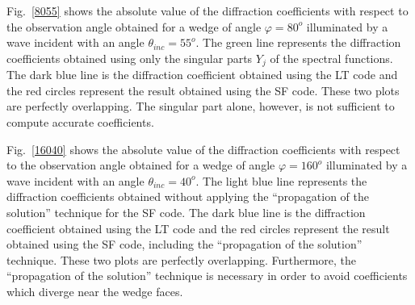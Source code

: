 Fig.~\ref{8055} shows the absolute value of the diffraction coefficients  with respect to the observation angle obtained for a wedge of angle $\varphi=80^o$ illuminated by a wave incident with an angle $\theta_{inc}=55^o$. The green line represents the diffraction coefficients obtained using only the singular parts $Y_j$ of the spectral functions. The dark blue line is the diffraction coefficient obtained using the LT code and the red circles represent the result obtained using the SF code. These two plots are perfectly overlapping. The singular part alone, however, is not sufficient to compute accurate coefficients. %

Fig.~\ref{16040} shows the absolute value of the diffraction coefficients with respect to the observation angle obtained for a wedge of angle $\varphi=160^o$ illuminated by a wave incident with an angle $\theta_{inc}=40^o$. The light blue line represents the diffraction coefficients obtained without applying the ``propagation of the solution'' technique for the SF code. The dark blue line is the diffraction coefficient obtained using the LT code and the red circles represent the result obtained using the SF code, including the ``propagation of the solution'' technique. These two plots are perfectly overlapping. Furthermore, the ``propagation of the solution'' technique is necessary in order to avoid coefficients which diverge near the wedge faces. %

